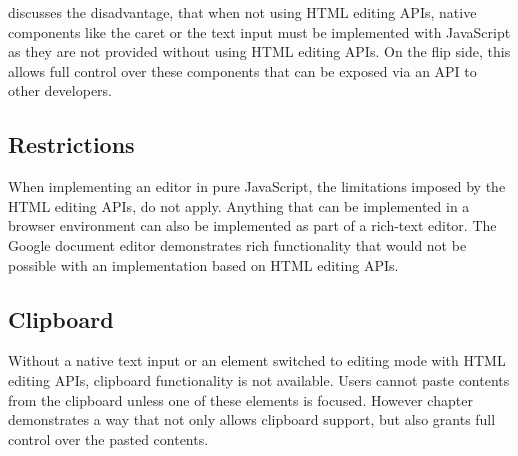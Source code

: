  discusses the disadvantage, that when not using HTML editing APIs, native components like the caret or the text input must be implemented with JavaScript as they are not provided without using HTML editing APIs. On the flip side, this allows full control over these components that can be exposed via an API to other developers.


\subsection{Restrictions} When implementing an editor in pure JavaScript, the limitations imposed by the HTML editing APIs, do not apply. Anything that can be implemented in a browser environment can also be implemented as part of a rich-text editor. The Google document editor demonstrates rich functionality that would not be possible with an implementation based on HTML editing APIs.%

\subsection{Clipboard}

Without a native text input or an element switched to editing mode with HTML editing APIs, clipboard functionality is not available. Users cannot paste contents from the clipboard unless one of these elements is focused. However chapter  demonstrates a way that not only allows clipboard support, but also grants full control over the pasted contents.


